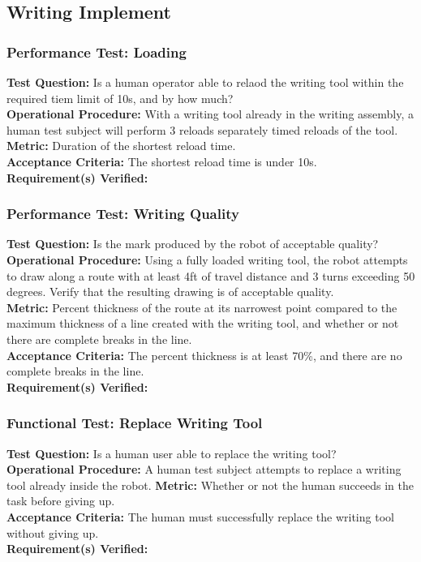 
\subsection{Writing Implement}
\label{sec:verification_writing_implement}

\subsubsection{Performance Test: Loading}
\label{test:writing_pt_load}
\textbf{Test Question:} Is a human operator able to relaod the writing tool within the required tiem limit of 10s, and by how much? \\
\textbf{Operational Procedure:} With a writing tool already in the writing assembly, a human test subject will perform 3 reloads separately timed reloads of the tool. \\
\textbf{Metric:} Duration of the shortest reload time. \\
\textbf{Acceptance Criteria:} The shortest reload time is under 10s. \\
\textbf{Requirement(s) Verified:} 

\subsubsection{Performance Test: Writing Quality}
\label{test:writing_pt_qual}
\textbf{Test Question:} Is the mark produced by the robot of acceptable quality? \\
\textbf{Operational Procedure:} Using a fully loaded writing tool, the robot attempts to draw along a route with at least 4ft of travel distance and 3 turns exceeding 50 degrees. Verify that the resulting drawing is of acceptable quality. \\
\textbf{Metric:} Percent thickness of the route at its narrowest point compared to the maximum thickness of a line created with the writing tool, and whether or not there are complete breaks in the line. \\
\textbf{Acceptance Criteria:} The percent thickness is at least 70\%, and there are no complete breaks in the line. \\
\textbf{Requirement(s) Verified:}  \\

\subsubsection{Functional Test: Replace Writing Tool}
\label{test:writing_ft_replace}
\textbf{Test Question:} Is a human user able to replace the writing tool? \\
\textbf{Operational Procedure:} A human test subject attempts to replace a writing tool already inside the robot.
\textbf{Metric:} Whether or not the human succeeds in the task before giving up.\\
\textbf{Acceptance Criteria:} The human must successfully replace the writing tool without giving up.  \\
\textbf{Requirement(s) Verified:} \\

